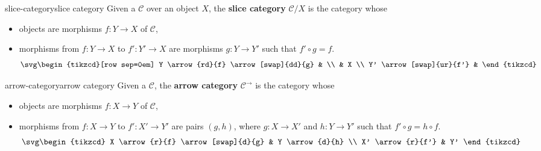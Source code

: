 
\begin{topic}{slice-category}{slice category}
    Given a  $\mathcal{C}$ over an object $X$, the \textbf{slice category} $\mathcal{C}/X$ is the category whose
    \begin{itemize}
        \item objects are morphisms $f : Y \to X$ of $\mathcal{C}$,
        \item morphisms from $f : Y \to X$ to $f' : Y' \to X$ are morphisms $g : Y \to Y'$ such that $f' \circ g = f$.
        \[ \svg \begin{tikzcd}[row sep=0em] Y \arrow{rd}{f} \arrow[swap]{dd}{g} & \\ & X \\ Y' \arrow[swap]{ur}{f'} & \end{tikzcd} \]
    \end{itemize}
\end{topic}

\begin{topic}{arrow-category}{arrow category}
    Given a  $\mathcal{C}$, the \textbf{arrow category} $\mathcal{C}^\rightarrow$ is the category whose
    \begin{itemize}
        \item objects are morphisms $f : X \to Y$ of $\mathcal{C}$,
        \item morphisms from $f : X \to Y$ to $f' : X' \to Y'$ are pairs $(g, h)$, where $g : X \to X'$ and $h : Y \to Y'$ such that $f' \circ g = h \circ f$.
        \[ \svg \begin{tikzcd} X \arrow{r}{f} \arrow[swap]{d}{g} & Y \arrow{d}{h} \\ X' \arrow{r}{f'} & Y' \end{tikzcd} \]
    \end{itemize}
\end{topic}

